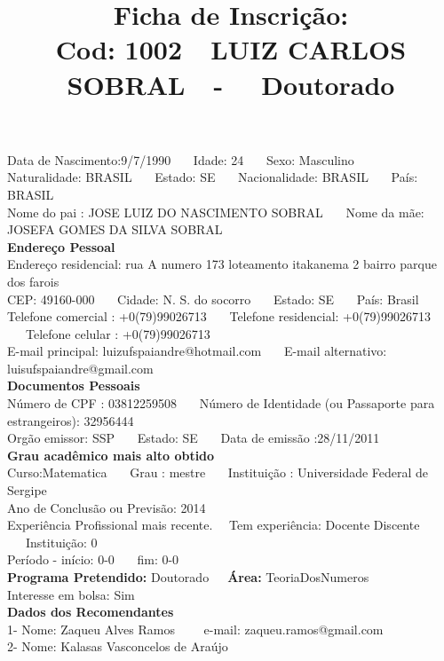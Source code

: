 \documentclass[11pt]{article}
\title{\vspace*{-4cm} Ficha de Inscrição: \\Cod: 1002\ \ LUIZ CARLOS SOBRAL\ \ - \ \ Doutorado 
 }
\date{}
\begin{document}
\maketitle
\vspace*{-1.5cm}
\noindent Data de Nascimento:9/7/1990
\ \ \ Idade: 24   \ \ \ Sexo: Masculino
\\
Naturalidade: BRASIL  
\ \ \  Estado: SE
\ \ \  Nacionalidade: BRASIL
\ \ \ País: BRASIL
\\        
Nome do pai : JOSE LUIZ DO NASCIMENTO SOBRAL
\ \ \ Nome da mãe: JOSEFA GOMES DA SILVA SOBRAL          
\\[0.2cm]                     
\textbf{Endereço Pessoal} 
\\ 
\noindent Endereço residencial: rua A   numero 173  loteamento itakanema 2   bairro parque dos farois
\\
        CEP: 49160-000 
\ \ \ Cidade: N. S.  do socorro 
\ \ \ Estado: SE 
\ \ \ País: Brasil
\\		
		Telefone comercial : +0(79)99026713
\ \ \ Telefone residencial: +0(79)99026713
\ \ \ Telefone celular : +0(79)99026713
\\
E-mail principal: luizufspaiandre@hotmail.com
\ \ \ E-mail alternativo: luisufspaiandre@gmail.com 
\\[0.2cm] 
\textbf{Documentos Pessoais}
\\
\noindent Número de CPF : 03812259508
\ \ \ Número de Identidade (ou Passaporte para estrangeiros): 32956444
\\
Orgão emissor: SSP
\ \ \ Estado: SE
\ \ \ Data de emissão :28/11/2011
\\[0.3cm]
\textbf{Grau acadêmico mais alto obtido}
\\	
Curso:Matematica
\ \ \ Grau : mestre
\ \ \ Instituição : Universidade Federal de Sergipe
\\			
Ano de Conclusão ou Previsão: 2014
\\ 
Experiência Profissional mais recente. \ \  
Tem experiência: Docente Discente  
\ \ \ Instituição: 0
\\  
Período - início: 0-0
\ \ \ fim: 0-0
\\[0.2cm] 
\textbf{Programa Pretendido:} Doutorado\ \ \ \textbf{Área:} TeoriaDosNumeros\\
Interesse em bolsa: Sim
\\[0.3cm]		
\textbf{Dados dos Recomendantes} 
\\
1- Nome: Zaqueu Alves Ramos
\ \ \ \  e-mail: zaqueu.ramos@gmail.com 
\\
2- Nome: Kalasas Vasconcelos de Araújo
\end{document}
